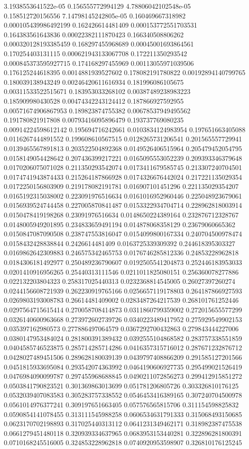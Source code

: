 \begin{table}
\begin{tabu}
\begin{sparkline}{10}
3.1938553641522e-05 0.156555772994129 4.78806042102548e-05 0.158512720156556 7.14798145242805e-05 0.160469667318982 0.000105439986492199 0.162426614481409 0.000153772551703531 0.164383561643836 0.00022382111870423 0.166340508806262 0.000320128193385459 0.168297455968689 0.00045001693864561 0.170254403131115 0.000621943133067708 0.172211350293542 0.000845373595927715 0.174168297455969 0.00113055971039506 0.176125244618395 0.0014881939527602 0.178082191780822 0.00192894140799765 0.180039138943249 0.00246420611616934 0.181996086105675 0.00311533522515671 0.183953033268102 0.00387489238983223 0.185909980430528 0.00474342243124412 0.187866927592955 0.00571674906867953 0.189823874755382 0.00678537949495562 0.191780821917808 0.00793416095896479 0.193737769080235 0.00914224598612142 0.195694716242661 0.0103834124983954 0.197651663405088 0.0116267444891552 0.199608610567515 0.0128265731206541 0.201565557729941 0.0139465567891813 0.203522504892368 0.0149526406515964 0.205479452054795 0.0158149054428642 0.207436399217221 0.0165095553052239 0.209393346379648 0.0170206075071028 0.211350293542074 0.0173411679585745 0.213307240704501 0.0174741943874433 0.215264187866928 0.0174326676442024 0.217221135029354 0.0172250156803909 0.219178082191781 0.016907101451296 0.221135029354207 0.0165192315038002 0.223091976516634 0.0161016952960446 0.225048923679061 0.0156939524744458 0.227005870841487 0.0153322934704714 0.228962818003914 0.0150478419198268 0.23091976516634 0.0148650224389164 0.232876712328767 0.0148005949201895 0.234833659491194 0.014878068358129 0.23679060665362 0.0150847087090508 0.238747553816047 0.0154099800167334 0.240704500978474 0.0158432428838844 0.2426614481409 0.0163725339309392 0.244618395303327 0.0169862642309883 0.246575342465753 0.0176746285812336 0.24853228962818 0.0184306181492977 0.250489236790607 0.0192505541204873 0.252446183953033 0.0201410916956265 0.25440313111546 0.0211011825080151 0.256360078277886 0.022132203804323 0.258317025440313 0.0232368814545005 0.26027397260274 0.0244156608721939 0.262230919765166 0.0256657119178803 0.264187866927593 0.0269803193008783 0.26614481409002 0.0283487264217539 0.268101761252446 0.0297564715615414 0.270058708414873 0.0311860799359002 0.272015655577299 0.0326140600963668 0.273972602739726 0.0340223489417952 0.275929549902153 0.035397162980573 0.277886497064579 0.0367292700432863 0.279843444227006 0.0380147953484024 0.281800391389432 0.0392555104868582 0.283757338551859 0.0404585746523875 0.285714285714286 0.0416357315716012 0.287671232876712 0.0428027489451506 0.289628180039139 0.0439797408866209 0.291585127201566 0.0451815933695084 0.293542074363992 0.0464190606927735 0.295499021526419 0.0476984090099787 0.297455968688845 0.0490211072856273 0.299412915851272 0.0503841790823521 0.301369863013699 0.051781206805726 0.303326810176125 0.0532039407083583 0.305283757338552 0.0546453416389165 0.307240704500978 0.0561014976377241 0.309197651663405 0.057576565815706 0.311154598825832 0.0590854141078455 0.313111545988258 0.0606534631791333 0.315068493150685 0.0623170702198893 0.317025440313112 0.0641231349462171 0.318982387475538 0.0661279451480118 0.320939334637965 0.0683953153440281 0.322896281800391 0.0710168245516005 0.324853228962818 0.0740920953598907 0.326810176125245 
\end{sparkline}
\end{tabu}
\end{table}
